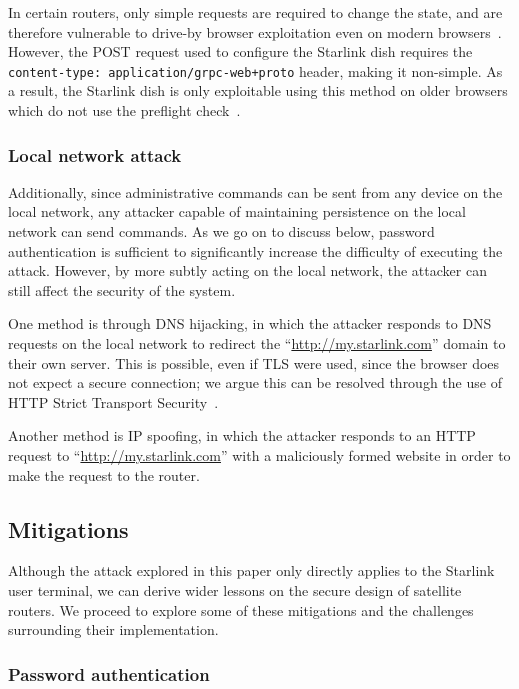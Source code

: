 In certain routers, only simple requests are required to change the state, and are therefore vulnerable to drive-by browser exploitation even on modern browsers~\cite{csrf_internal_network}.
However, the POST request used to configure the Starlink dish requires the \texttt{content-type: application/grpc-web+proto} header, making it non-simple.
As a result, the Starlink dish is only exploitable using this method on older browsers which do not use the preflight check~\cite{cors_w3c}.

\subsubsection{Local network attack}

Additionally, since administrative commands can be sent from any device on the local network, any attacker capable of maintaining persistence on the local network can send commands.
As we go on to discuss below, password authentication is sufficient to significantly increase the difficulty of executing the attack.
However, by more subtly acting on the local network, the attacker can still affect the security of the system.

One method is through DNS hijacking, in which the attacker responds to DNS requests on the local network to redirect the ``\url{http://my.starlink.com}'' domain to their own server.
This is possible, even if TLS were used, since the browser does not expect a secure connection; we argue this can be resolved through the use of HTTP Strict Transport Security~\cite{rfc6797}.

Another method is IP spoofing, in which the attacker responds to an HTTP request to ``\url{http://my.starlink.com}'' with a maliciously formed website in order to make the request to the router.

\subsection{Mitigations}

Although the attack explored in this paper only directly applies to the Starlink user terminal, we can derive wider lessons on the secure design of satellite routers.
We proceed to explore some of these mitigations and the challenges surrounding their implementation.

\subsubsection{Password authentication}\label{sec:password_authentication}

